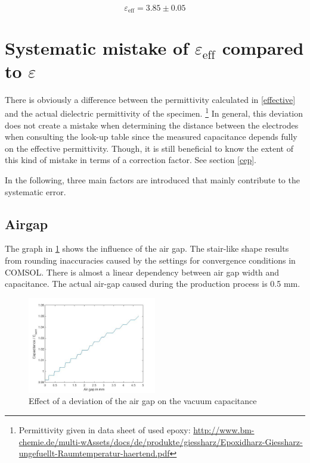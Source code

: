 \begin{equation}
 \varepsilon_{\textrm{eff}}=3.85 \pm 0.05
\end{equation}



\section{Systematic mistake of $\varepsilon_{\textrm{eff}}$ compared to $\varepsilon$}

There is obviously a difference between the permittivity calculated in \ref{effective}
and the actual dielectric permittivity of the specimen. \footnote{Permittivity given in data sheet of used epoxy: \url{http://www.bm-chemie.de/multi-wAssets/docs/de/produkte/giessharz/Epoxidharz-Giessharz-ungefuellt-Raumtemperatur-haertend.pdf}}
In general, this deviation does not create a mistake when determining the
distance between the electrodes when consulting the look-up table since the
measured capacitance depends fully on the effective permittivity. Though, it is still
beneficial to know the extent of this kind of mistake in terms of a correction factor. See section \ref{cep}.

In the following, three main factors are introduced that mainly contribute to the systematic error.

\subsection{Airgap}
The graph in \ref{fig.airgap} shows the influence of the air gap. The stair-like shape results from rounding inaccuracies caused by the settings for convergence
conditions in COMSOL. There is almost a linear dependency between air gap width and capacitance. The actual air-gap caused during the production process is 0.5 mm. 

\begin{figure}[h!tb]
	\centering
	\includegraphics[width=0.5\textwidth]{figures/Results/airgap_height/airgap_graph.jpg}		
	\caption[Kurze Abbildungsbeschreibung]{Effect of a deviation of the air gap on the vacuum capacitance}
	\label{fig.airgap}
\end{figure}
 
